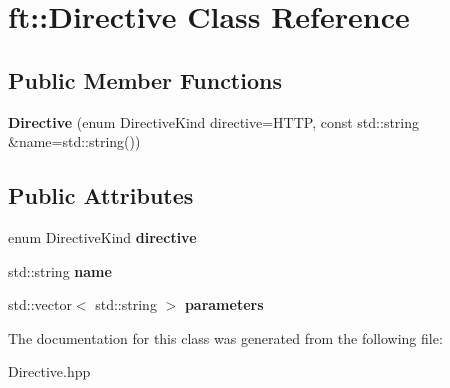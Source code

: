 \hypertarget{classft_1_1Directive}{}\section{ft\+:\+:Directive Class Reference}
\label{classft_1_1Directive}
\subsection*{Public Member Functions}
\begin{DoxyCompactItemize}
\item 
\mbox{\label{classft_1_1Directive_a60882c86b6b53d33c79ad5535edda0e6}} 
{\bfseries Directive} (enum Directive\+Kind directive=H\+T\+TP, const std\+::string \&name=std\+::string())
\end{DoxyCompactItemize}
\subsection*{Public Attributes}
\begin{DoxyCompactItemize}
\item 
\mbox{\label{classft_1_1Directive_a7a9f88819a7d9f3106e0972d1ca1e8cf}} 
enum Directive\+Kind {\bfseries directive}
\item 
\mbox{\label{classft_1_1Directive_a4eaa14f34ca2156a375d871fb50e4d65}} 
std\+::string {\bfseries name}
\item 
\mbox{\label{classft_1_1Directive_a4bde47b7bd7551a3d1c076631ff28976}} 
std\+::vector$<$ std\+::string $>$ {\bfseries parameters}
\end{DoxyCompactItemize}


The documentation for this class was generated from the following file\+:\begin{DoxyCompactItemize}
\item 
Directive.\+hpp\end{DoxyCompactItemize}
